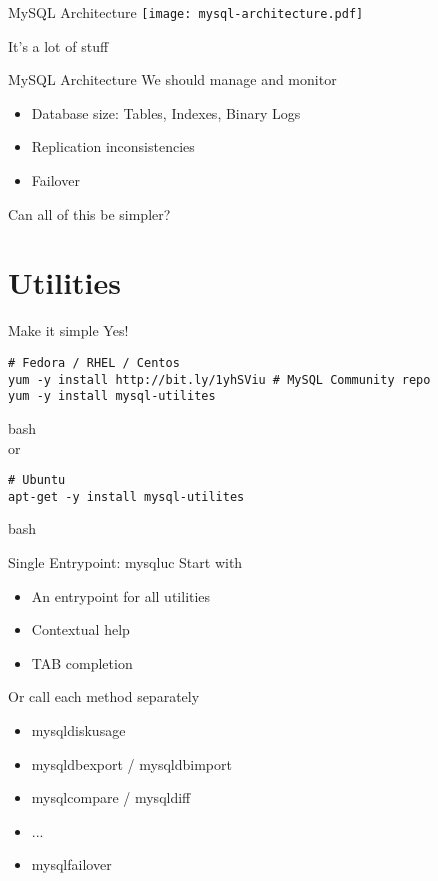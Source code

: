 \documentclass{beamer}[10]
\begin{document}
\begin{pyframe}{MySQL Architecture}
\texttt{[image: mysql-architecture.pdf]}
{\large
\begin{center}
It's a lot of stuff
\end{center}
}
\end{pyframe}


\begin{pyframe}{MySQL Architecture}
We should manage and monitor
\begin{itemize}
\item Database size: Tables, Indexes, Binary Logs
\item Replication inconsistencies
\item Failover
\end{itemize}
Can all of this be simpler?
\end{pyframe}

\section{Utilities}
\begin{pyframe}{Make it simple}
Yes!
\iffalse
    \begin{verbatim}
    # wget http://bit.ly/1CxNuZe
    # tar xf mysql-utilities-1.6.1.tar.gz
    # python setup.py install
    \end{verbatim}{bash}
    or
\fi
\begin{verbatim}
# Fedora / RHEL / Centos
yum -y install http://bit.ly/1yhSViu # MySQL Community repo
yum -y install mysql-utilites
\end{verbatim}{bash}
\\or\\
\begin{verbatim}
# Ubuntu
apt-get -y install mysql-utilites
\end{verbatim}{bash}
\end{pyframe}


\begin{pyframe}{Single Entrypoint: mysqluc}
Start with 
\begin{itemize}
\item An entrypoint for all utilities
\item Contextual help
\item TAB completion
\end{itemize}
Or call each method separately
\begin{itemize}
\item mysqldiskusage
\item mysqldbexport / mysqldbimport
\item mysqlcompare / mysqldiff
\item ...
\item mysqlfailover
\end{itemize}
\end{pyframe}
\end{document}

